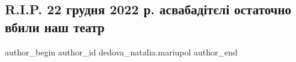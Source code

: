  
 
 
 
 

\subsection{R.I.P. 22 грудня 2022 р. асвабадітєлі остаточно вбили наш театр}
\label{sec:23_12_2022.fb.dedova_natalia.mariupol.2.r_i_p__22_grudnya_20}

\ifcmt
 author_begin
   author_id dedova_natalia.mariupol
 author_end
\fi
